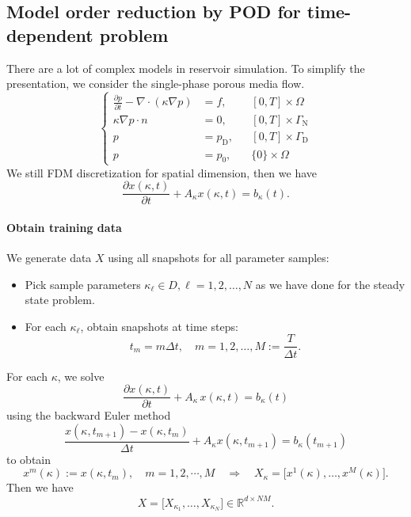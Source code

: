 \subsection{Model order reduction by POD for time-dependent problem}
There are a lot of complex models in reservoir simulation. To simplify the presentation, we consider the single-phase porous media flow. 
\begin{equation} \label{time-single}
\left\{
\begin{aligned}
\frac{\partial p}{\partial t} - \nabla \cdot (\kappa \nabla p) & = f, & &  [0,T] \times \Omega\\
\kappa \nabla p \cdot n & = 0, & &  [0,T] \times \Gamma_{\text{N}} \\
p & = p_\text{D}, & &  [0,T] \times \Gamma_\text{D} \\
p & = p_{0}, & & \{0\} \times \Omega
\end{aligned}
\right.
\end{equation}
We still FDM discretization for spatial dimension, then we have
\begin{equation}
\frac{\partial x(\kappa, t)}{\partial t}+A_{\kappa}x(\kappa,t)=b_{\kappa}(t).
\end{equation}

\paragraph{Obtain training data}
We generate data $X$ using all snapshots for all parameter samples:
\begin{itemize}
%
\item Pick sample parameters  $\kappa_\ell \in D, \ell=1, 2, \ldots, N$ as we have done for the steady state problem. 
%
\item For each $\kappa_{\ell}$, obtain snapshots at time steps: 
$$
t_m = m \Delta t,\quad  m =1, 2, \ldots, M:=\frac{T}{\Delta t}.
$$
%
\end{itemize}
For each $\kappa$, we solve 
\begin{equation}
\frac{\partial x(\kappa, t)}{\partial t}+A_{\kappa} \, x(\kappa, t)=b_{\kappa}(t)
\end{equation}
using the backward Euler method  
$$
\frac{x(\kappa, t_{m+1})-x(\kappa, t_m)}{\Delta t}+A_{\kappa}x(\kappa,t_{m+1})=b_{\kappa}(t_{m+1})
$$
to obtain 
$$
x ^{m}(\kappa) :=x(\kappa,t_m), \quad m=1,2, \cdots, M \quad \Longrightarrow \quad X_{\kappa} = \Big[x^{1}(\kappa), \ldots, x^{M}(\kappa) \Big].
$$  
Then we have 
$$
X = \Big[ X_{\kappa_{1}}, \ldots, X_{\kappa_{N}} \Big]\in \mathbb{R}^{d\times NM}.
$$

